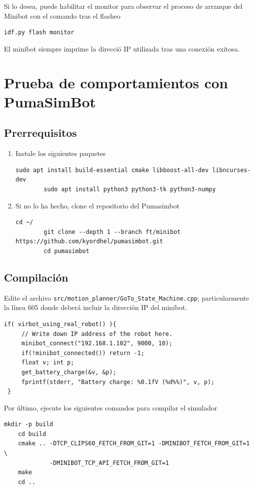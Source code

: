 \documentclass[letterpaper,10.5pt]{article}
\begin{document}
Si lo desea, puede habilitar el monitor para observar el proceso de arranque del Minibot con el comando tras el flasheo
\begin{Verbatim}[gobble=1]
idf.py flash monitor
\end{Verbatim}
\noindent
El minibot siempre imprime la direcció IP utilizada tras una conexión exitosa.


\section{Prueba de comportamientos con PumaSimBot}
\subsection{Prerrequisitos}
\begin{enumerate}
	\item Instale los siguientes paquetes
	\begin{Verbatim}[gobble=2]
		sudo apt install build-essential cmake libboost-all-dev libncurses-dev
		sudo apt install python3 python3-tk python3-numpy
	\end{Verbatim}

	\item Si no lo ha hecho, clone el repositorio del Pumasimbot
	\begin{Verbatim}[gobble=2]
		cd ~/
		git clone --depth 1 --branch ft/minibot https://github.com/kyordhel/pumasimbot.git
		cd pumasimbot
	\end{Verbatim}
\end{enumerate}

\subsection{Compilación}
Edite el archivo \texttt{src/motion\_planner/GoTo\_State\_Machine.cpp}; particularmente la línea 605 donde deberá incluir la dirección IP del minibot.
\begin{Verbatim}[gobble=1]
 if( virbot_using_real_robot() ){
     // Write down IP address of the robot here.
     minibot_connect("192.168.1.102", 9000, 10);
     if(!minibot_connected()) return -1;
     float v; int p;
     get_battery_charge(&v, &p);
     fprintf(stderr, "Battery charge: %0.1fV (%d%%)", v, p);
 }
\end{Verbatim}


Por último, ejecute los siguientes comandos para compilar el simulador
\begin{Verbatim}[gobble=1]
	mkdir -p build
	cd build
	cmake .. -DTCP_CLIPS60_FETCH_FROM_GIT=1 -DMINIBOT_FETCH_FROM_GIT=1 \
	         -DMINIBOT_TCP_API_FETCH_FROM_GIT=1
	make
	cd ..
\end{Verbatim}
\end{document}
